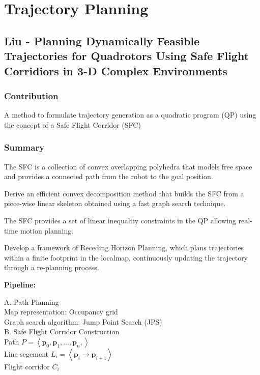 \section{Trajectory Planning}

\subsection{Liu - Planning Dynamically Feasible Trajectories for Quadrotors Using Safe Flight Corridiors in 3-D Complex Environments}

\subsubsection{Contribution}
A method to formulate trajectory generation as a quadratic program (QP) using the concept of a Safe Flight Corridor (SFC)

\subsubsection{Summary}
The SFC is a collection of convex overlapping polyhedra that models free space and provides a connected path from the robot to the goal position. 

Derive an efficient convex decomposition method that builds the SFC from a piece-wise linear skeleton obtained using a fast graph search technique.

The SFC provides a set of linear inequality constraints in the QP allowing real-time motion planning. 

Develop a framework of Receding Horizon Planning, which plans trajectories within a finite footprint in the localmap, continuously updating the trajectory through a re-planning process. 

\textbf{Pipeline:}

A. Path Planning\\

Map representation: Occupancy grid\\
Graph search algorithm: Jump Point Search (JPS)\\

B. Safe Flight Corridor Construction\\

Path $P = \left\langle \mathbf{p}_0, \mathbf{p}_1, ... ,\mathbf{p}_n,  \right\rangle$\\
Line segement $L_i = \left\langle \mathbf{p}_i \rightarrow \mathbf{p}_{i+1} \right\rangle$\\
Flight corridor $C_i$\\

